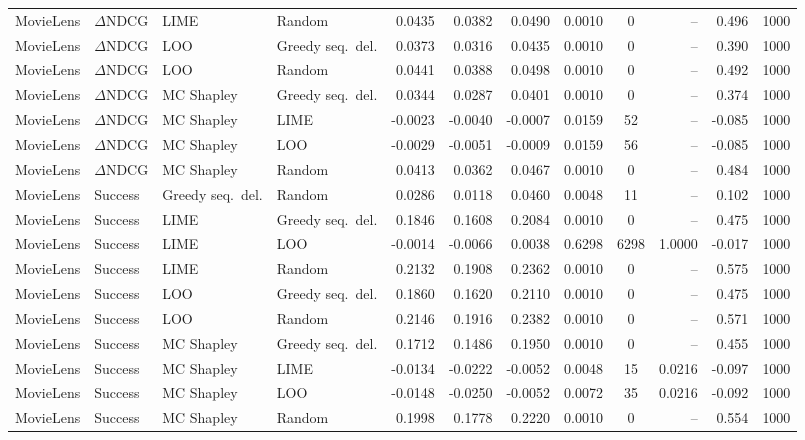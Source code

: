 \begin{longtable}{@{}p{}p{}p{}p{}rrrrcrrr@{}}
MovieLens & $\Delta$NDCG & LIME & Random & 0.0435 & 0.0382 & 0.0490 & 0.0010 & 0 & -- & 0.496 & 1000 \\
MovieLens & $\Delta$NDCG & LOO & Greedy seq.\ del. & 0.0373 & 0.0316 & 0.0435 & 0.0010 & 0 & -- & 0.390 & 1000 \\
MovieLens & $\Delta$NDCG & LOO & Random & 0.0441 & 0.0388 & 0.0498 & 0.0010 & 0 & -- & 0.492 & 1000 \\
MovieLens & $\Delta$NDCG & MC Shapley & Greedy seq.\ del. & 0.0344 & 0.0287 & 0.0401 & 0.0010 & 0 & -- & 0.374 & 1000 \\
MovieLens & $\Delta$NDCG & MC Shapley & LIME & -0.0023 & -0.0040 & -0.0007 & 0.0159 & 52 & -- & -0.085 & 1000 \\
MovieLens & $\Delta$NDCG & MC Shapley & LOO & -0.0029 & -0.0051 & -0.0009 & 0.0159 & 56 & -- & -0.085 & 1000 \\
MovieLens & $\Delta$NDCG & MC Shapley & Random & 0.0413 & 0.0362 & 0.0467 & 0.0010 & 0 & -- & 0.484 & 1000 \\
MovieLens & Success & Greedy seq.\ del. & Random & 0.0286 & 0.0118 & 0.0460 & 0.0048 & 11 & -- & 0.102 & 1000 \\
MovieLens & Success & LIME & Greedy seq.\ del. & 0.1846 & 0.1608 & 0.2084 & 0.0010 & 0 & -- & 0.475 & 1000 \\
MovieLens & Success & LIME & LOO & -0.0014 & -0.0066 & 0.0038 & 0.6298 & 6298 & 1.0000 & -0.017 & 1000 \\
MovieLens & Success & LIME & Random & 0.2132 & 0.1908 & 0.2362 & 0.0010 & 0 & -- & 0.575 & 1000 \\
MovieLens & Success & LOO & Greedy seq.\ del. & 0.1860 & 0.1620 & 0.2110 & 0.0010 & 0 & -- & 0.475 & 1000 \\
MovieLens & Success & LOO & Random & 0.2146 & 0.1916 & 0.2382 & 0.0010 & 0 & -- & 0.571 & 1000 \\
MovieLens & Success & MC Shapley & Greedy seq.\ del. & 0.1712 & 0.1486 & 0.1950 & 0.0010 & 0 & -- & 0.455 & 1000 \\
MovieLens & Success & MC Shapley & LIME & -0.0134 & -0.0222 & -0.0052 & 0.0048 & 15 & 0.0216 & -0.097 & 1000 \\
MovieLens & Success & MC Shapley & LOO & -0.0148 & -0.0250 & -0.0052 & 0.0072 & 35 & 0.0216 & -0.092 & 1000 \\
MovieLens & Success & MC Shapley & Random & 0.1998 & 0.1778 & 0.2220 & 0.0010 & 0 & -- & 0.554 & 1000 \\
\end{longtable}
